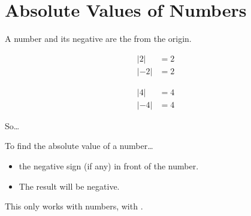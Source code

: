 \section{Absolute Values of Numbers}

A number and its negative are the   from the origin.
\begin{tcbraster}[
    raster columns=2,
    raster before skip = 1em, raster after skip = 1em,
    ]
    \begin{tcolorbox}[colback=white,]
        \vspace{2\baselineskip}
        \begin{align*}
            |2| &= 2\\
            |-2| &= 2
        \end{align*}
    \end{tcolorbox}
    \begin{tcolorbox}[colback=white,]
        \vspace{2\baselineskip}
        \begin{align*}
            |4| &= 4\\
            |-4| &= 4
        \end{align*}
    \end{tcolorbox}
\end{tcbraster}

So\dots

\begin{myConcept}{To find the absolute value of a number\dots}
    \begin{itemize}
        \item {} the negative sign (if any) in front of the number.
        \item The result will  be negative.
    \end{itemize}
    \begin{tcolorbox}[center,width=5.5in,]
        \centering
        This only works with numbers,  with .
    \end{tcolorbox}
\end{myConcept}


